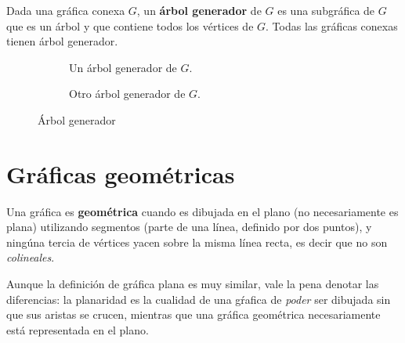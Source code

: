 \begin{definition}
Dada una gr\'afica conexa $G$, un \textbf{\'arbol generador} de $G$ es una subgr\'afica de $G$ que es un \'arbol y que contiene todos los v\'ertices de $G$. Todas las gr\'aficas conexas tienen \'arbol generador.
\end{definition}

\begin{figure}
\centering
  \begin{subfigure}{0.4\textwidth}
    \caption{Un \'arbol generador de $G$.}\label{fig:graph}
  \end{subfigure}
  \begin{subfigure}{0.4\textwidth}
    \caption{Otro \'arbol generador de $G$.}
  \end{subfigure}
  \caption{\'Arbol generador}
\end{figure}

\section{Gr\'aficas geom\'etricas}

\begin{definition}
Una gr\'afica es \textbf{geom\'etrica} cuando es dibujada en el plano (no necesariamente es plana) utilizando segmentos (parte de una l\'inea, definido por dos puntos), y ning\'una tercia de v\'ertices yacen sobre la misma l\'inea recta, es decir que no son \emph{colineales}. \cite{handbook}
\end{definition}

Aunque la definición de gráfica plana es muy similar, vale la pena denotar las diferencias: la planaridad es la cualidad de una gŕafica de \textit{poder} ser dibujada sin que sus aristas se crucen, mientras que una gráfica geométrica necesariamente está representada en el plano.


